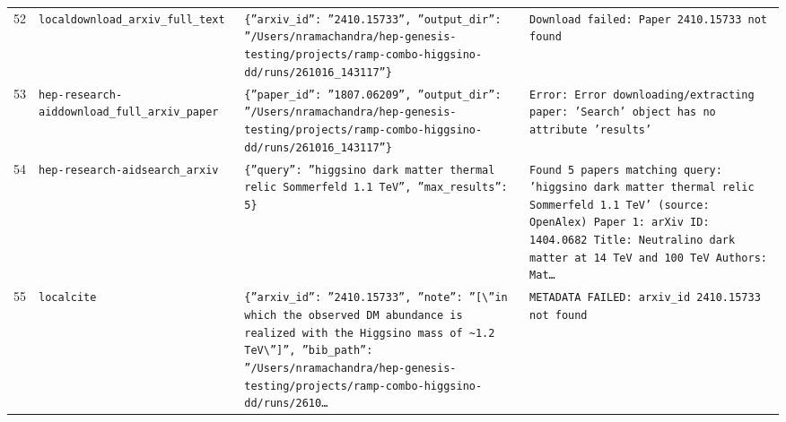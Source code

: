 \documentclass[11pt,a4paper]{article}
\begin{document}
\begin{longtable}{@{}p{}p{}p{}p{}@{}}
52 & \texttt{local}\newline\texttt{download\_\allowbreak{}arxiv\_\allowbreak{}full\_\allowbreak{}text} & \texttt{\{''arxiv\_\allowbreak{}id'':\allowbreak{} ''2410.15733'',\allowbreak{} ''output\_\allowbreak{}dir'':\allowbreak{} ''/\allowbreak{}Users/\allowbreak{}nramachandra/\allowbreak{}hep-genesis-testing/\allowbreak{}projects/\allowbreak{}ramp-combo-higgsino-dd/\allowbreak{}runs/\allowbreak{}261016\_\allowbreak{}143117''\}\allowbreak{}} & \texttt{Download failed:\allowbreak{} Paper 2410.15733 not found} \\
53 & \texttt{hep-research-aid}\newline\texttt{download\_\allowbreak{}full\_\allowbreak{}arxiv\_\allowbreak{}paper} & \texttt{\{''paper\_\allowbreak{}id'':\allowbreak{} ''1807.06209'',\allowbreak{} ''output\_\allowbreak{}dir'':\allowbreak{} ''/\allowbreak{}Users/\allowbreak{}nramachandra/\allowbreak{}hep-genesis-testing/\allowbreak{}projects/\allowbreak{}ramp-combo-higgsino-dd/\allowbreak{}runs/\allowbreak{}261016\_\allowbreak{}143117''\}\allowbreak{}} & \texttt{Error:\allowbreak{} Error downloading/\allowbreak{}extracting paper:\allowbreak{} 'Search' object has no attribute 'results'} \\
54 & \texttt{hep-research-aid}\newline\texttt{search\_\allowbreak{}arxiv} & \texttt{\{''query'':\allowbreak{} ''higgsino dark matter thermal relic Sommerfeld 1.1 TeV'',\allowbreak{} ''max\_\allowbreak{}results'':\allowbreak{} 5\}\allowbreak{}} & \texttt{Found 5 papers matching query:\allowbreak{} 'higgsino dark matter thermal relic Sommerfeld 1.1 TeV' (source:\allowbreak{} OpenAlex)\allowbreak{}  Paper 1:\allowbreak{} arXiv ID:\allowbreak{} 1404.0682 Title:\allowbreak{} Neutralino dark matter at 14 TeV and 100 TeV Authors:\allowbreak{} Mat\ldots{}\allowbreak{}} \\
55 & \texttt{local}\newline\texttt{cite} & \texttt{\{''arxiv\_\allowbreak{}id'':\allowbreak{} ''2410.15733'',\allowbreak{} ''note'':\allowbreak{} ''[\textbackslash{}\allowbreak{}''in which the observed DM abundance is realized with the Higgsino mass of \textasciitilde{}\allowbreak{}1.2 TeV\textbackslash{}\allowbreak{}'']\allowbreak{}'',\allowbreak{} ''bib\_\allowbreak{}path'':\allowbreak{} ''/\allowbreak{}Users/\allowbreak{}nramachandra/\allowbreak{}hep-genesis-testing/\allowbreak{}projects/\allowbreak{}ramp-combo-higgsino-dd/\allowbreak{}runs/\allowbreak{}2610\ldots{}\allowbreak{}} & \texttt{METADATA FAILED:\allowbreak{} arxiv\_\allowbreak{}id 2410.15733 not found} \\

\end{longtable}
\end{document}
